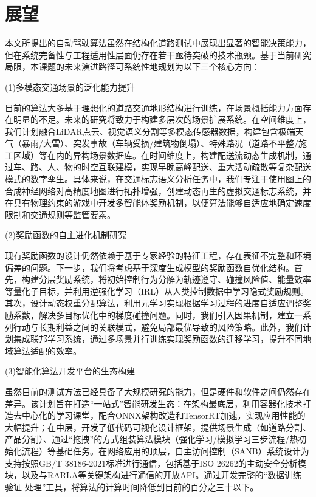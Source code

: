 \section{展望}

本文所提出的自动驾驶算法虽然在结构化道路测试中展现出显著的智能决策能力，但在系统完备性与工程适用性层面仍存在若干亟待突破的技术瓶颈。基于当前研究局限，本课题的未来演进路径可系统性地规划为以下三个核心方向：

(1)多模态交通场景的泛化能力提升

目前的算法大多基于理想化的道路交通地形结构进行训练，在场景概括能力方面存在明显的不足。未来的研究将致力于构建多层次的场景扩展系统。在空间维度上，我们计划融合LiDAR点云、视觉语义分割等多模态传感器数据，构建包含极端天气（暴雨/大雪）、突发事故（车辆受损/建筑物倒塌）、特殊路况（道路不平整/施工区域）等在内的异构场景数据库。在时间维度上，构建配送流动态生成机制，通过车、路、人、物的时空互联建模，实现早晚高峰配送、重大活动疏散等复杂配送模式的数字孪生。具体来说，在交通标志语义分析任务中，我们专注于使用图上的合成神经网络对高精度地图进行拓扑增强，创建动态再生的虚拟交通标志系统，并在具有物理约束的游戏中开发多智能体奖励机制，以便算法能够自适应地确定速度限制和交通规则等监管要素。

(2)奖励函数的自主进化机制研究

现有奖励函数的设计仍然依赖于基于专家经验的特征工程，存在表征不完整和环境偏差的问题。下一步，我们将考虑基于深度生成模型的奖励函数自优化结构。首先，构建分层奖励系统，将初始控制行为分解为轨迹遵守、碰撞风险值、能量效率等量化子目标，并利用逆强化学习（IRL）从人类控制数据中学习隐式奖励规则。其次，设计动态权重分配算法，利用元学习实现根据学习过程的进度自适应调整奖励系数，解决多目标优化中的梯度碰撞问题。同时，我们引入因果机制，建立一系列行动与长期利益之间的关联模式，避免局部最优导致的风险策略。此外，我们计划集成联邦学习系统，通过多场景并行训练实现奖励函数的迁移学习，提升不同地域算法适配的效率。

(3)智能化算法开发平台的生态构建

虽然目前的测试方法已经具备了大规模研究的能力，但是硬件和软件之间仍然存在差异。该计划旨在打造“一站式”智能研发生态：在架构最底层，利用容器化技术打造去中心化的学习课堂，配合ONNX架构改造和TensorRT加速，实现应用性能的大幅提升；在中层，开发了低代码可视化设计框架，提供场景生成（如道路分割、产品分割）、通过“拖拽”的方式组装算法模块（强化学习/模拟学习三步流程/热初始化流程）等基础任务。在网络应用的顶层，自主访问控制（SANB）系统设计为支持按照GB/T 38186-2021标准进行通信，包括基于ISO 26262的主动安全分析模块，以及与RARLA等关键架构进行通信的开放API。通过开发完整的“数据训练-验证-处理”工具，将算法的计算时间降低到目前的百分之三十以下。

